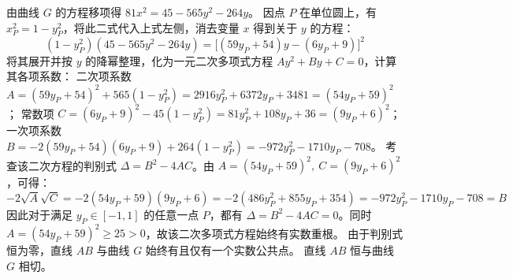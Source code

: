 \begin{solution}
由曲线 $G$ 的方程移项得 $81x^2 = 45 - 565y^2 - 264y$。
因点 $P$ 在单位圆上，有 $x_P^2 = 1 - y_P^2$，将此二式代入上式左侧，消去变量 $x$ 得到关于 $y$ 的方程：
$$ (1 - y_P^2)(45 - 565y^2 - 264y) = \big[(59y_P + 54)y - (6y_P + 9)\big]^2 $$
将其展开并按 $y$ 的降幂整理，化为一元二次多项式方程 $Ay^2 + By + C = 0$，计算其各项系数：
二次项系数 $A = (59y_P + 54)^2 + 565(1 - y_P^2) = 2916y_P^2 + 6372y_P + 3481 = (54y_P + 59)^2$；
常数项 $C = (6y_P + 9)^2 - 45(1 - y_P^2) = 81y_P^2 + 108y_P + 36 = (9y_P + 6)^2$；
一次项系数 $B = -2(59y_P + 54)(6y_P + 9) + 264(1 - y_P^2) = -972y_P^2 - 1710y_P - 708$。
考查该二次方程的判别式 $\Delta = B^2 - 4AC$。由 $A=(54y_P+59)^2,\ C=(9y_P+6)^2$，可得：
$$ -2\sqrt{A}\sqrt{C} = -2(54y_P + 59)(9y_P + 6) = -2(486y_P^2 + 855y_P + 354) = -972y_P^2 - 1710y_P - 708 = B $$
因此对于满足 $y_P \in [-1, 1]$ 的任意一点 $P$，都有 $\Delta = B^2 - 4AC = 0$。同时 $A = (54y_P + 59)^2 \ge 25 > 0$，故该二次多项式方程始终有实数重根。
由于判别式恒为零，直线 $AB$ 与曲线 $G$ 始终有且仅有一个实数公共点。
直线 $AB$ 恒与曲线 $G$ 相切。
\end{solution}



